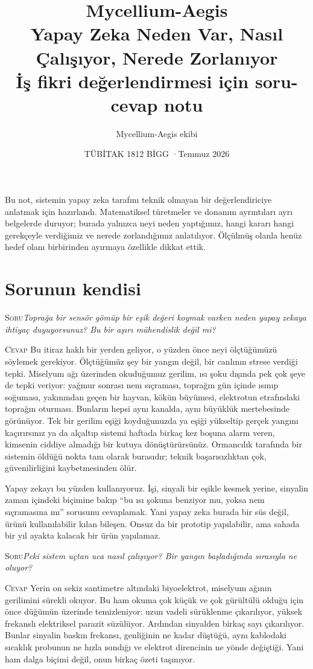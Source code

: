 \documentclass[11pt,a4paper]{article}
\title{\normalfont\LARGE Mycellium-Aegis\\[6pt]
  \large Yapay Zeka Neden Var, Nasıl Çalışıyor, Nerede Zorlanıyor\\[5pt]
  \normalsize\textcolor{muted}{İş fikri değerlendirmesi için soru-cevap notu}}
\author{\normalfont\normalsize Mycellium-Aegis ekibi}
\date{\normalfont\small TÜBİTAK 1812 BİGG \quad·\quad Temmuz 2026}
\newcommand{\soru}[1]{%
  \par\vskip 15pt plus 4pt minus 2pt
  \noindent\textcolor{ember}{\textsc{Soru}}\quad\emph{#1}%
  \par\vskip 6pt\noindent\textcolor{myco}{\textsc{Cevap}}\quad\ignorespaces}
\begin{document}
\maketitle
\thispagestyle{empty}

\textcolor{muted}{Bu not, sistemin yapay zeka tarafını teknik olmayan bir
değerlendiriciye anlatmak için hazırlandı. Matematiksel türetmeler ve
donanım ayrıntıları ayrı belgelerde duruyor; burada yalnızca neyi neden
yaptığımız, hangi kararı hangi gerekçeyle verdiğimiz ve nerede
zorlandığımız anlatılıyor. Ölçülmüş olanla henüz hedef olanı birbirinden
ayırmaya özellikle dikkat ettik.}

\vskip 10pt

\section*{Sorunun kendisi}

\soru{Toprağa bir sensör gömüp bir eşik değeri koymak varken neden yapay
zekaya ihtiyaç duyuyorsunuz? Bu bir aşırı mühendislik değil mi?}
Bu itiraz haklı bir yerden geliyor, o yüzden önce neyi ölçtüğümüzü
söylemek gerekiyor. Ölçtüğümüz şey bir yangın değil, bir canlının
strese verdiği tepki. Miselyum ağı üzerinden okuduğumuz gerilim, ısı
şoku dışında pek çok şeye de tepki veriyor: yağmur sonrası nem sıçraması,
toprağın gün içinde ısınıp soğuması, yakınından geçen bir hayvan,
kökün büyümesi, elektrotun etrafındaki toprağın oturması. Bunların
hepsi aynı kanalda, aynı büyüklük mertebesinde görünüyor. Tek bir
gerilim eşiği koyduğunuzda ya eşiği yükseltip gerçek yangını kaçırırsınız
ya da alçaltıp sistemi haftada birkaç kez boşuna alarm veren, kimsenin
ciddiye almadığı bir kutuya dönüştürürsünüz. Ormancılık tarafında bir
sistemin öldüğü nokta tam olarak burasıdır; teknik başarısızlıktan çok,
güvenilirliğini kaybetmesinden ölür.

Yapay zekayı bu yüzden kullanıyoruz. İşi, sinyali bir eşikle kesmek
yerine, sinyalin zaman içindeki biçimine bakıp ``bu ısı şokuna benziyor
mu, yoksa nem sıçramasına mı'' sorusunu cevaplamak. Yani yapay zeka
burada bir süs değil, ürünü kullanılabilir kılan bileşen. Onsuz da bir
prototip yapılabilir, ama sahada bir yıl ayakta kalacak bir ürün
yapılamaz.

\soru{Peki sistem uçtan uca nasıl çalışıyor? Bir yangın başladığında
sırasıyla ne oluyor?}
Yerin on sekiz santimetre altındaki biyoelektrot, miselyum ağının
gerilimini sürekli okuyor. Bu ham okuma çok küçük ve çok gürültülü
olduğu için önce düğümün üzerinde temizleniyor: uzun vadeli sürüklenme
çıkarılıyor, yüksek frekanslı elektriksel parazit süzülüyor. Ardından
sinyalden birkaç sayı çıkarılıyor. Bunlar sinyalin baskın frekansı,
genliğinin ne kadar düştüğü, aynı kablodaki sıcaklık probunun ne hızla
ısındığı ve elektrot direncinin ne yönde değiştiği. Yani ham dalga
biçimi değil, onun birkaç özeti taşınıyor.
\end{document}
